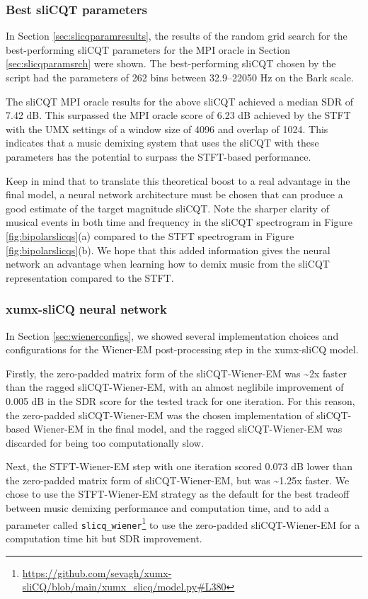 \documentclass[report.tex]{subfiles}
\begin{document}
\subsubsection{Best sliCQT parameters}

In Section \ref{sec:slicqparamresults}, the results of the random grid search for the best-performing sliCQT parameters for the MPI oracle in Section \ref{sec:slicqparamsrch} were shown. The best-performing sliCQT chosen by the script had the parameters of 262 bins between 32.9--22050 Hz on the Bark scale.

The sliCQT MPI oracle results for the above sliCQT achieved a median SDR of 7.42 dB. This surpassed the MPI oracle score of 6.23 dB achieved by the STFT with the UMX settings of a window size of 4096 and overlap of 1024. This indicates that a music demixing system that uses the sliCQT with these parameters has the potential to surpass the STFT-based performance.

Keep in mind that to translate this theoretical boost to a real advantage in the final model, a neural network architecture must be chosen that can produce a good estimate of the target magnitude sliCQT. Note the sharper clarity of musical events in both time and frequency in the sliCQT spectrogram in Figure \ref{fig:bipolarslicqs}(a) compared to the STFT spectrogram in Figure \ref{fig:bipolarslicqs}(b). We hope that this added information gives the neural network an advantage when learning how to demix music from the sliCQT representation compared to the STFT.

\subsubsection{xumx-sliCQ neural network}
\label{sec:netdiscuss}

In Section \ref{sec:wienerconfigs}, we showed several implementation choices and configurations for the Wiener-EM post-processing step in the xumx-sliCQ model.

Firstly, the zero-padded matrix form of the sliCQT-Wiener-EM was \textasciitilde2x faster than the ragged sliCQT-Wiener-EM, with an almost neglibile improvement of 0.005 dB in the SDR score for the tested track for one iteration. For this reason, the zero-padded sliCQT-Wiener-EM was the chosen implementation of sliCQT-based Wiener-EM in the final model, and the ragged sliCQT-Wiener-EM was discarded for being too computationally slow.

Next, the STFT-Wiener-EM step with one iteration scored 0.073 dB lower than the zero-padded matrix form of sliCQT-Wiener-EM, but was \textasciitilde1.25x faster. We chose to use the STFT-Wiener-EM strategy as the default for the best tradeoff between music demixing performance and computation time, and to add a parameter called \Verb#slicq_wiener#\footnote{\url{https://github.com/sevagh/xumx-sliCQ/blob/main/xumx_slicq/model.py\#L380}} to use the zero-padded sliCQT-Wiener-EM for a computation time hit but SDR improvement.
\end{document}
